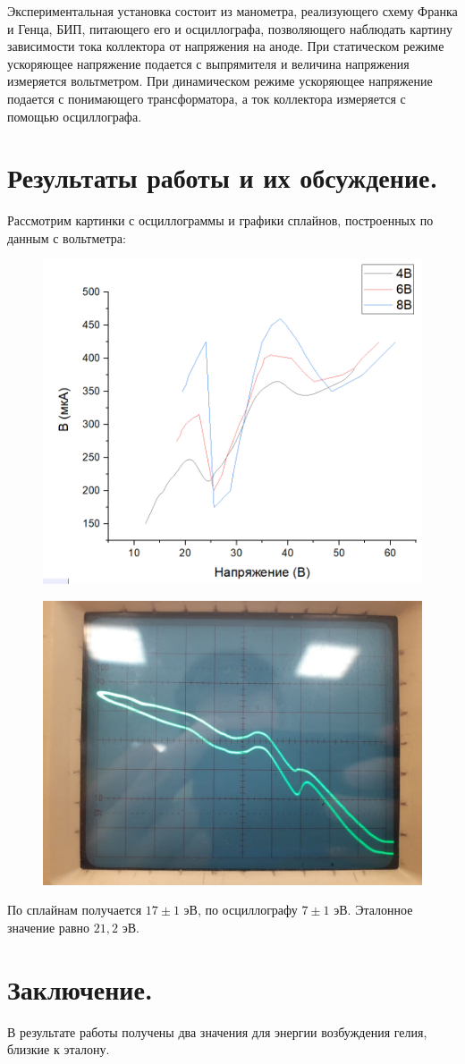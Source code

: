 \documentclass[%
 reprint,
 amsmath,amssymb,
 aps,
]{revtex4-2}
\begin{document}
Экспериментальная установка состоит из манометра, реализующего схему Франка и Генца, БИП, питающего его и осциллографа, позволяющего наблюдать картину зависимости тока коллектора от напряжения на аноде. При статическом режиме ускоряющее напряжение подается с выпрямителя и величина напряжения измеряется вольтметром. При динамическом режиме ускоряющее напряжение подается с понимающего трансформатора, а ток коллектора измеряется с помощью осциллографа.


\section{Результаты работы и их обсуждение.}

Рассмотрим картинки с осциллограммы и графики сплайнов, построенных по данным с вольтметра: 

\begin{figure}[]
	\includegraphics[scale=0.5]{1.png}
\end{figure}
\begin{figure}[]
	\includegraphics[scale=0.4]{2.jpg}
\end{figure}
 
По сплайнам получается $17 \pm 1 $ эВ, по осциллографу $7 \pm 1$ эВ. Эталонное значение равно $21,2$ эВ.
\section{Заключение.}

В результате работы получены два значения для энергии возбуждения гелия, близкие к эталону.
\end{document}
